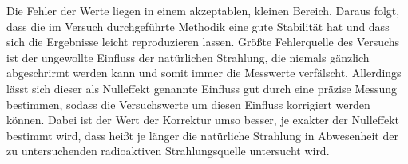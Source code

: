\documentclass[
  bibliography=totoc,     %
  captions=tableheading,  %
  titlepage=firstiscover, %
]{scrartcl}
\begin{document}
Die Fehler der Werte liegen in einem akzeptablen, kleinen Bereich. Daraus folgt,
dass die im Versuch durchgeführte Methodik eine gute Stabilität hat und dass
sich die Ergebnisse leicht reproduzieren lassen. Größte Fehlerquelle des
Versuchs ist der ungewollte Einfluss der natürlichen Strahlung, die niemals
gänzlich abgeschrirmt werden kann und somit immer die Messwerte verfälscht.
Allerdings lässt sich dieser als Nulleffekt genannte Einfluss gut durch eine
präzise Messung bestimmen, sodass die Versuchswerte um diesen Einfluss
korrigiert werden können. Dabei ist der Wert der Korrektur umso besser, je
exakter der Nulleffekt bestimmt wird, dass heißt je länger die natürliche
Strahlung in Abwesenheit der zu untersuchenden radioaktiven Strahlungsquelle
untersucht wird.
\clearpage
\nocite{*}
\printbibliography
\end{document}
